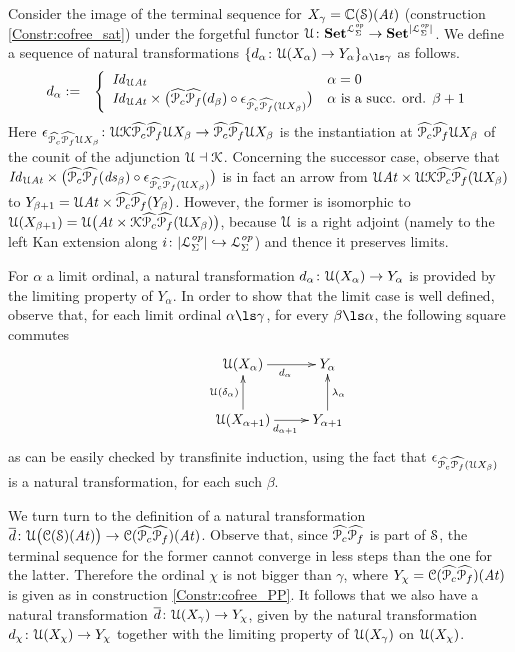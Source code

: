 \begin{construction} Consider the image of the terminal sequence for $X_{\gamma} = \mathbb{C}(\mathcal{S})(\mathit{At})$ (construction \ref{Constr:cofree_sat}) under the forgetful functor
$\mathcal{U}\colon \mathbf{Set}^{\mathcal{L}^{\mathit{op}}_{\Sigma}} \to \mathbf{Set}^{|\mathcal{L}^{\mathit{op}}_{\Sigma}|}$. We define a sequence of natural transformations $\{d_{\alpha}\: \U(X_{\alpha}) \to Y_{\alpha} \}_{\alpha\ls\gamma}$ as follows.
 \begin{eqnarray}   \label{eq:desat_cone_sigma}
   d_{\alpha} &:=& \left\{
	\begin{array}{ll}
        \mathit{Id}_{\mathcal{U} \mathit{At}} & \alpha = 0 \\
		\mathit{Id}_{\mathcal{U} \mathit{At}} \times \big(\widehat{\mathcal P _c}\widehat{\mathcal P _f} (d_{\beta}) \circ \epsilon_{\widehat{\mathcal P _c}\widehat{\mathcal P _f} (\mathcal{U} X_{\beta})}\big) & \alpha \mbox{ is a succ. ord. } \beta +1
	\end{array}
\right.
 \end{eqnarray}
Here $\epsilon_{\widehat{\mathcal P _c}\widehat{\mathcal P _f} \mathcal{U} X_{\beta}}\colon \mathcal{U}\mathcal{K}\widehat{\mathcal P _c}\widehat{\mathcal P _f} \mathcal{U} X_{\beta} \to \widehat{\mathcal P _c}\widehat{\mathcal P _f} \mathcal{U} X_{\beta}$ is the instantiation at $\widehat{\mathcal P _c}\widehat{\mathcal P _f} \mathcal{U} X_{\beta}$ of the counit of
the adjunction $\mathcal{U} \dashv \mathcal{K}$. Concerning the successor case, observe that
$\mathit{Id}_{\mathcal{U} \mathit{At}} \times \big(\widehat{\mathcal P _c}\widehat{\mathcal P _f} (\mathit{ds}_{\beta}) \circ \epsilon_{\widehat{\mathcal P _c}\widehat{\mathcal P _f} (\mathcal{U} X_{\beta})}\big)$
is in fact an arrow from $\mathcal{U}\mathit{At} \times \mathcal{U}\mathcal{K}\widehat{\mathcal P _c}\widehat{\mathcal P _f}(\mathcal{U} X_{\beta})$ to $Y_{\beta+1} = \mathcal{U}\mathit{At} \times \widehat{\mathcal P _c}\widehat{\mathcal P _f} (Y_{\beta})$. However, the former is isomorphic to $\mathcal{U} (X_{\beta+1}) = \mathcal{U} \big(\mathit{At} \times \mathcal{K}\widehat{\mathcal P _c}\widehat{\mathcal P _f}(\mathcal{U} X_{\beta})\big)$, because $\mathcal{U}$ is a right adjoint (namely to the left Kan extension along $i \colon |\mathcal{L}^{\mathit{op}}_{\Sigma}| \hookrightarrow \mathcal{L}^{\mathit{op}}_{\Sigma}$) and thence it preserves limits.

For $\alpha$ a limit ordinal, a natural transformation $d_{\alpha}\colon \mathcal{U}(X_{\alpha}) \to Y_{\alpha}$ is provided by the limiting property of $Y_{\alpha}$. In order to show that the limit case is well defined, observe that, for each limit ordinal $\alpha \ls \gamma$, for every $\beta \ls \alpha$, the following square commutes
\[\xymatrix{
& \U (X_{\alpha}) \ar[r]_{d_{\alpha}} & Y_{\alpha} \\
& \U (X_{\alpha +1}) \ar[r]_{d_{\alpha +1}} \ar[u]^{\U(\delta_{\alpha})} & Y_{\alpha +1} \ar[u]_{\lambda_{\alpha}}\\
}
\]
as can be easily checked by transfinite induction, using the fact that $\epsilon_{\widehat{\mathcal P _c}\widehat{\mathcal P _f} (\mathcal{U} X_{\beta})}$ is a natural transformation, for each such $\beta$.

We turn turn to the definition of a natural transformation $\overline{d} \colon \mathcal{U} \big( \mathcal{C}(\mathcal{S})(\mathit{At})\big) \to \mathcal{C}(\widehat{\mathcal P _c}\widehat{\mathcal P _f})(\mathit{At})$. Observe that, since $\widehat{\mathcal P _c}\widehat{\mathcal P _f}$ is part of $\mathcal{S}$, the terminal sequence for the former cannot converge in less steps than the one for the latter. Therefore the ordinal $\chi$ is not bigger than $\gamma$, where $Y_{\chi} = \mathcal{C}(\widehat{\mathcal P _c}\widehat{\mathcal P _f})(\mathit{At})$ is given as in construction \ref{Constr:cofree_PP}. It follows that we also have a natural transformation $\overline{d} \colon \mathcal{U}(X_{\gamma}) \to Y_{\chi}$, given by the natural transformation $d_{\chi} \colon \mathcal{U}(X_{\chi}) \to Y_{\chi}$ together with the limiting property of $\mathcal{U}(X_{\gamma})$ on $\mathcal{U}(X_{\chi})$.
\end{construction}




